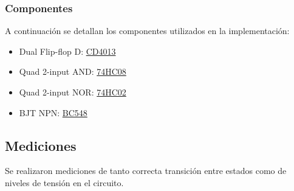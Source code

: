 \subsubsection{Componentes}
A continuación se detallan los componentes utilizados en la implementación:
\begin{itemize}
\item Dual Flip-flop D: \href{http://www.ti.com/lit/ds/symlink/cd4013b.pdf}{CD4013}
\item Quad 2-input AND: \href{https://www.mouser.com/datasheet/2/308/74HC08.REV1-102589.pdf}{74HC08}
\item Quad 2-input NOR: \href{https://assets.nexperia.com/documents/data-sheet/74HC_HCT02.pdf}{74HC02}
\item BJT NPN: \href{http://www.philohome.com/sensors/gp2d12/gp2d12-datasheets/bc548.pdf}{BC548}
\end{itemize}

\subsection{Mediciones}

Se realizaron mediciones de tanto correcta transición entre estados como de niveles de tensión en el circuito.

